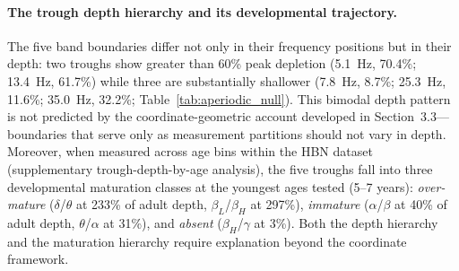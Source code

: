 \paragraph{The trough depth hierarchy and its developmental trajectory.}
The five band boundaries differ not only in their frequency positions but in their depth: two troughs show greater than 60\% peak depletion (5.1~Hz, 70.4\%; 13.4~Hz, 61.7\%) while three are substantially shallower (7.8~Hz, 8.7\%; 25.3~Hz, 11.6\%; 35.0~Hz, 32.2\%; Table~\ref{tab:aperiodic_null}). This bimodal depth pattern is not predicted by the coordinate-geometric account developed in Section~3.3---boundaries that serve only as measurement partitions should not vary in depth. Moreover, when measured across age bins within the HBN dataset (supplementary trough-depth-by-age analysis), the five troughs fall into three developmental maturation classes at the youngest ages tested (5--7 years): \emph{over-mature} ($\delta$/$\theta$ at 233\% of adult depth, $\beta_L$/$\beta_H$ at 297\%), \emph{immature} ($\alpha$/$\beta$ at 40\% of adult depth, $\theta$/$\alpha$ at 31\%), and \emph{absent} ($\beta_H$/$\gamma$ at 3\%). Both the depth hierarchy and the maturation hierarchy require explanation beyond the coordinate framework.

